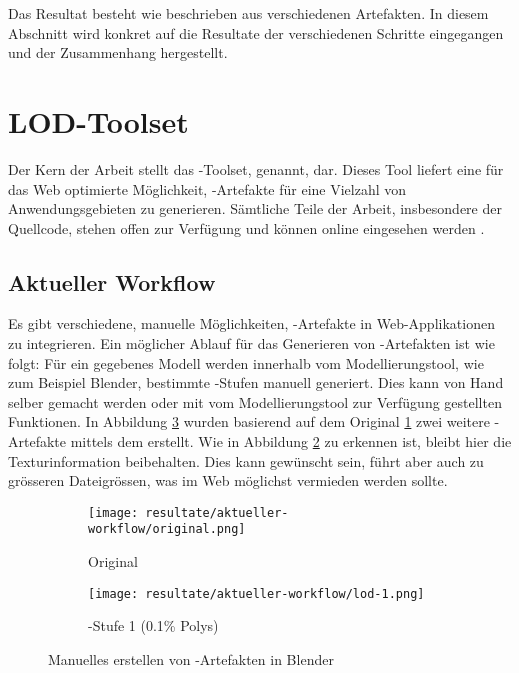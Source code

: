 Das Resultat besteht wie beschrieben aus verschiedenen Artefakten. In diesem Abschnitt wird konkret auf die Resultate der verschiedenen Schritte eingegangen und der Zusammenhang hergestellt.

\section{LOD-Toolset}

Der Kern der Arbeit stellt das -Toolset,  genannt, dar. Dieses Tool liefert eine für das Web optimierte Möglichkeit, -Artefakte für eine Vielzahl von Anwendungsgebieten zu generieren. Sämtliche Teile der Arbeit, insbesondere der Quellcode, stehen offen zur Verfügung und können online eingesehen werden \cite{lode}.

\subsection{Aktueller Workflow}

Es gibt verschiedene, manuelle Möglichkeiten, -Artefakte in Web-Applikationen zu integrieren. Ein möglicher Ablauf für das Generieren von -Artefakten ist wie folgt:
Für ein gegebenes Modell werden innerhalb vom Modellierungstool, wie zum Beispiel Blender, bestimmte -Stufen manuell generiert. Dies kann von Hand selber gemacht werden oder mit vom Modellierungstool zur Verfügung gestellten Funktionen. In Abbildung \ref{fig:manualLodGenerationInBlender} wurden basierend auf dem Original \ref{fig:manualLodGenerationInBlenderOriginal} zwei weitere -Artefakte mittels dem  erstellt. Wie in Abbildung \ref{fig:manualLodGenerationInBlenderSimplified} zu erkennen ist, bleibt hier die Texturinformation beibehalten. Dies kann gewünscht sein, führt aber auch zu grösseren Dateigrössen, was im Web möglichst vermieden werden sollte.

\begin{figure}[H]
  \centering
  \begin{subfigure}{.45\textwidth}
    \centering
    \texttt{[image: resultate/aktueller-workflow/original.png]}
    \caption{Original}
    \label{fig:manualLodGenerationInBlenderOriginal}
  \end{subfigure}
  \begin{subfigure}{.45\textwidth}
    \centering
    \texttt{[image: resultate/aktueller-workflow/lod-1.png]}
    \caption{-Stufe 1 (0.1\% Polys)}
    \label{fig:manualLodGenerationInBlenderSimplified}
  \end{subfigure}
  \caption{Manuelles erstellen von -Artefakten in Blender}
  \label{fig:manualLodGenerationInBlender}
\end{figure}

